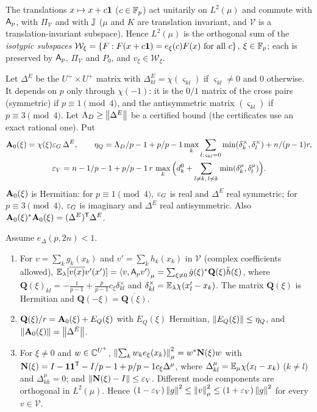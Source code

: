 The translations $x\mapsto x+c\mathbf 1$ ($c\in\mathbb F_p$) act unitarily on $L^2(\mu)$ and
commute with $\mathsf A_p$, with $\Pi_{\mathcal V}$ and with $\mathbb J$ ($\mu$ and $K$ are
translation invariant, and $\mathcal V$ is a translation-invariant subspace).
Hence $L^2(\mu)$ is the orthogonal sum of the \emph{isotypic subspaces}
$\mathcal W_\xi=\{F:F(x+c\one)=e_\xi(c)F(x)\ \text{for all}\ c\}$, $\xi\in\mathbb F_p$; each
is preserved by $\mathsf A_p$, $\Pi_{\mathcal V}$ and $P_0$, and $v_\xi\in\mathcal W_\xi$.

Let $\Delta^E$ be the $U^+\times U^+$ matrix with $\Delta^E_{kl}=\chi(\varsigma_{kl})$
if $\varsigma_{kl}\ne0$ and $0$ otherwise. It depends on $p$ only through
$\chi(-1)$: it is the $0/1$ matrix of the cross pairs (symmetric) if
$p\equiv1\pmod4$, and the antisymmetric matrix $(\varsigma_{kl})$ if
$p\equiv3\pmod4$. Let $\Lambda_D\ge\left\|\Delta^E\right\|$ be a certified bound (the
certificates use an exact rational one). Put
\begin{gather}
  \mathbf A_{0}(\xi)=\chi(\xi)\varepsilon_G\,\Delta^E,\qquad
  \eta_Q=\Lambda_D/p-1+p/p-1\max_k\sum_{l:\,\varsigma_{kl}=0}\min(\delta^\times_k,\delta^\times_l)
  +n/(p-1)r,\label{eq:spec:Azero}\\
  \varepsilon_V=n-1/p-1+p/p-1\,r\,\max_k\Big(d^0_k+\sum_{l\ne k,\,l\not\sim k}
  \min(\delta^\mu_k,\delta^\mu_l)\Big).\label{eq:spec:epsV}
\end{gather}
$\mathbf A_{0}(\xi)$ is Hermitian: for $p\equiv1\pmod4$, $\varepsilon_G$ is real and $\Delta^E$
real symmetric; for $p\equiv3\pmod4$, $\varepsilon_G$ is imaginary and $\Delta^E$ real
antisymmetric. Also $\mathbf A_{0}(\xi)^*\mathbf A_{0}(\xi)=(\Delta^E)^{\mathsf T}\Delta^E$.

\begin{lemma}\label{lem:spec:degone}
Assume $e_\Delta(p,2n)<1$.
\begin{enumerate}[label=\textup{(\alph*)}]
\item For $v=\sum_kg_k(x_k)$ and $v'=\sum_kh_k(x_k)$ in $\mathcal V$ (complex
  coefficients allowed),
  $\mathbb E_\lambda[\overline{v(x)}v'(x')]=\left\langle v,\mathsf A_p v'\right\rangle_\mu=\sum_{\xi\ne0}\hat g(\xi)^*\mathbf Q(\xi)\hat h(\xi)$,
  where $\mathbf Q(\xi)_{kl}=-\frac1{p-1}+\frac p{p-1}c_\xi\delta^\times_{kl}$ and
  $\delta^\times_{kl}=\mathbb E_\lambda\chi(x'_l-x_k)$. The matrix $\mathbf Q(\xi)$ is Hermitian and
  $\mathbf Q(-\xi)=\overline{\mathbf Q(\xi)}$.
\item $\mathbf Q(\xi)/r=\mathbf A_{0}(\xi)+E_Q(\xi)$ with $E_Q(\xi)$ Hermitian,
  $\left\|E_Q(\xi)\right\|\le\eta_Q$, and $\left\|\mathbf A_{0}(\xi)\right\|=\left\|\Delta^E\right\|$.
\item For $\xi\ne0$ and $w\in\mathbb C^{U^+}$,
  $\left\|\sum_kw_ke_\xi(x_k)\right\|^2_\mu=w^*\mathbf N(\xi)w$ with
  $\mathbf N(\xi)=I-\mathbf 1\mathbf 1^{\mathsf T}-I/p-1+p/p-1c_\xi\Delta^\mu$, where
  $\Delta^\mu_{kl}=\mathbb E_\mu\chi(x_l-x_k)$ ($k\ne l$) and $\Delta^\mu_{kk}=0$; and
  $\left\|\mathbf N(\xi)-I\right\|\le\varepsilon_V$. Different mode components are orthogonal in
  $L^2(\mu)$. Hence $(1-\varepsilon_V)\left\|g\right\|^2\le\left\|v\right\|^2_\mu\le(1+\varepsilon_V)\left\|g\right\|^2$ for
  every $v\in\mathcal V$.
\end{enumerate}
\end{lemma}

